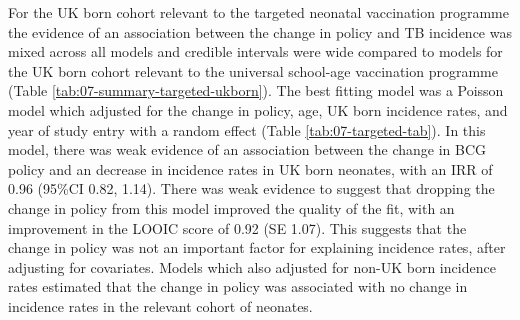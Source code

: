 \documentclass[11pt,twoside]{bristolthesis}
\begin{document}
  For the UK born cohort relevant to the targeted neonatal vaccination programme the evidence of an association between the change in policy and TB incidence was mixed across all models and credible intervals were wide compared to models for the UK born cohort relevant to the universal school-age vaccination programme (Table \ref{tab:07-summary-targeted-ukborn}). The best fitting model was a Poisson model which adjusted for the change in policy, age, UK born incidence rates, and year of study entry with a random effect (Table \ref{tab:07-targeted-tab}). In this model, there was weak evidence of an association between the change in BCG policy and an decrease in incidence rates in UK born neonates, with an IRR of 0.96 (95\%CI 0.82, 1.14). There was weak evidence to suggest that dropping the change in policy from this model improved the quality of the fit, with an improvement in the LOOIC score of 0.92 (SE 1.07). This suggests that the change in policy was not an important factor for explaining incidence rates, after adjusting for covariates. Models which also adjusted for non-UK born incidence rates estimated that the change in policy was associated with no change in incidence rates in the relevant cohort of neonates.
  
\end{document}
